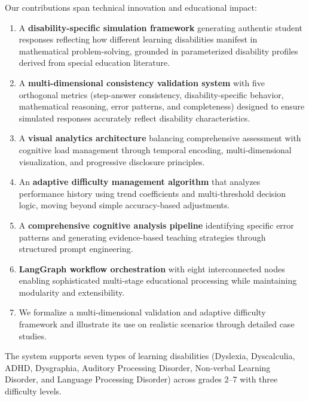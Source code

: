 \documentclass[11pt]{article}
\begin{document}
Our contributions span technical innovation and educational impact:

\begin{enumerate}
    \item A \textbf{disability-specific simulation framework} generating authentic student responses reflecting how different learning disabilities manifest in mathematical problem-solving, grounded in parameterized disability profiles derived from special education literature.
    
    \item A \textbf{multi-dimensional consistency validation system} with five orthogonal metrics (step-answer consistency, disability-specific behavior, mathematical reasoning, error patterns, and completeness) designed to ensure simulated responses accurately reflect disability characteristics.
    
    \item A \textbf{visual analytics architecture} balancing comprehensive assessment with cognitive load management through temporal encoding, multi-dimensional visualization, and progressive disclosure principles.
    
    \item An \textbf{adaptive difficulty management algorithm} that analyzes performance history using trend coefficients and multi-threshold decision logic, moving beyond simple accuracy-based adjustments.
    
    \item A \textbf{comprehensive cognitive analysis pipeline} identifying specific error patterns and generating evidence-based teaching strategies through structured prompt engineering.
    
    \item \textbf{LangGraph workflow orchestration} with eight interconnected nodes enabling sophisticated multi-stage educational processing while maintaining modularity and extensibility.
    
    \item We formalize a multi-dimensional validation and adaptive difficulty framework and illustrate its use on realistic scenarios through detailed case studies.
\end{enumerate}

The system supports seven types of learning disabilities (Dyslexia, Dyscalculia, ADHD, Dysgraphia, Auditory Processing Disorder, Non-verbal Learning Disorder, and Language Processing Disorder) across grades 2--7 with three difficulty levels.
\end{document}
